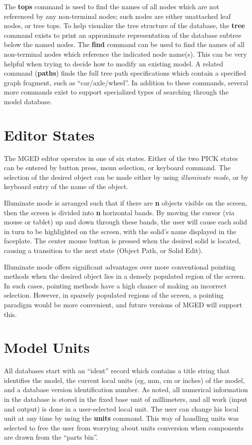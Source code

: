 The {\bf tops} command is used to find the names of all nodes which are
not referenced by any non-terminal nodes;  such nodes are either
unattached leaf nodes, or tree tops.
To help visualize the tree structure of the database,
the {\bf tree} command exists to
print an approximate representation of the database subtree below the
named nodes.
The {\bf find} command can be used to find the names of all non-terminal
nodes which reference the indicated node name(s).  This can be very helpful
when trying to decide how to modify an existing model.
A related command ({\bf paths}) finds the full tree path specifications
which contain a specified graph fragment, such as ``car/axle/wheel''.
In addition to these commands, several more commands exist
to support specialized types of searching through the model database.

\section{Editor States}

The MGED editor operates in one of six states.
Either of the two PICK states can be entered by button press,
menu selection, or keyboard command.  The selection of the desired
object can be made either by using {\em illuminate mode}, or by
keyboard entry of the name of the object.

Illuminate mode is arranged such that if there are {\bf n} objects visible on
the screen, then the screen is divided into {\bf n} horizontal bands.
By moving the cursor (via mouse or tablet) up and down through these bands,
the user will cause each solid in turn to be highlighted on the screen,
with the solid's name displayed in the faceplate.
The center mouse button is pressed when the desired solid is located, causing
a transition to the next state (Object Path, or Solid Edit).

Illuminate mode offers significant advantages over more conventional pointing
methods when the desired object lies in a densely populated region of the
screen.  In such cases, pointing methods have a high chance of making an
incorrect selection.
However, in sparsely populated regions of the screen, a pointing paradigm
would be more convenient, and future versions of MGED will support this.

\section{Model Units}

All databases start with an ``ident'' record which contains
a title string that identifies the model, the
current local units (eg, mm, cm or inches) of the model,
and a database version identification number.
As noted, all numerical information
in the database is stored in the fixed base
unit of millimeters,
and all work (input and output) is done in a user-selected local unit.
The user can change his local unit at any time
by using the {\bf units} command.
This way of handling units was selected to free the user from worrying
about units conversion when components are drawn from the ``parts bin''.
